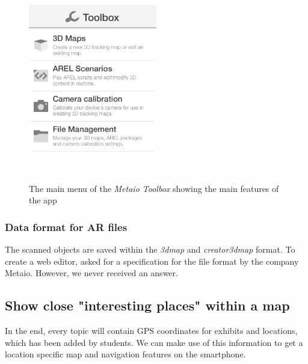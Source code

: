 \begin{figure}[th]
\centerline{\includegraphics[width=0.5\textwidth]{gfx/toolbox.png}}
\caption{The main menu of the \emph{Metaio Toolbox} showing the main features of the app}
\label{MetToolbox}
\end{figure}	

\subsubsection{Data format for \ac{AR} files}
The scanned objects are saved within the \emph{3dmap} and \emph{creator3dmap} format. To create a web editor, asked for a specification for the file format by the company Metaio. However, we never received an answer. 

\subsection{Show close "interesting places" within a map} 
In the end, every topic will contain \ac{GPS} coordinates for exhibits and locations, which has been added by students. We can make use of this information to get a location specific map and navigation features on the smartphone. 

